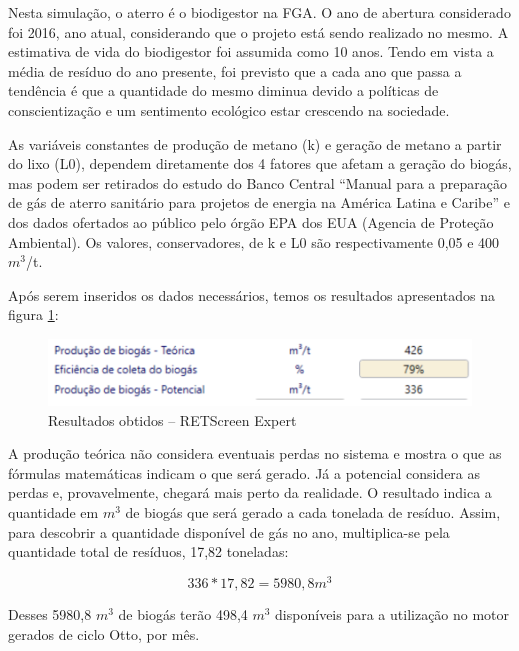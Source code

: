 Nesta simulação, o aterro é o biodigestor na FGA. O ano de abertura considerado foi 2016, ano atual, considerando que o projeto está sendo realizado no mesmo. A estimativa de vida do biodigestor foi assumida como 10 anos. Tendo em vista a média de resíduo do ano presente, foi previsto que a cada ano que passa a tendência é que a quantidade do mesmo diminua devido a políticas de conscientização e um sentimento ecológico estar crescendo na sociedade.

As variáveis constantes de produção de metano (k) e geração de metano a partir do lixo (L0), dependem diretamente dos 4 fatores que afetam a geração do biogás, mas podem ser retirados do estudo do Banco Central “Manual para a preparação de gás de aterro sanitário para projetos de energia na América Latina e Caribe” e dos dados ofertados ao público pelo órgão EPA dos EUA (Agencia de Proteção Ambiental). Os valores, conservadores, de k e L0 são respectivamente 0,05 e 400 $m^{3}$/t.

Após serem inseridos os dados necessários, temos os resultados apresentados na figura \ref{fig:ret3}:

\begin{figure}[!htb]
\centering
\includegraphics[width=\textwidth]{figuras/ret3.png}
\caption{Resultados obtidos – RETScreen Expert}
\label{fig:ret3}
\end{figure}

A produção teórica não considera eventuais perdas no sistema e mostra o que as fórmulas matemáticas indicam o que será gerado. Já a potencial considera as perdas e, provavelmente, chegará mais perto da realidade. O resultado indica a quantidade em $m^{3}$ de biogás que será gerado a cada tonelada de resíduo. Assim, para descobrir a quantidade disponível de gás no ano, multiplica-se pela quantidade total de resíduos, 17,82 toneladas:

\[336 * 17,82 = 5980,8 m^{3}\]

Desses 5980,8 $m^{3}$ de biogás terão 498,4 $m^{3}$ disponíveis para a utilização no motor gerados de ciclo Otto, por mês.

